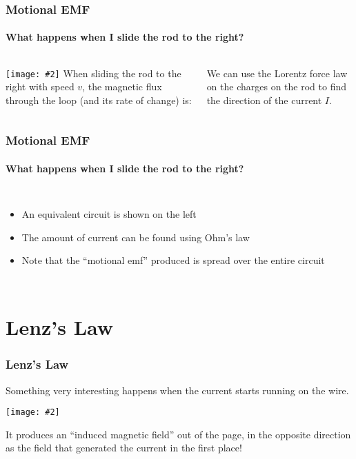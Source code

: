 \documentclass[12pt,aspectratio=169]{beamer}
\newcommand{\pic}[2]{\texttt{[image: \#2]}}
\begin{document}
\begin{frame}
  \frametitle{Motional EMF}
  \framesubtitle{What happens when I slide the rod to the right?}
  \begin{columns}
    \pic{1}{motional-emf-1.jpg}
    When sliding the rod to the right with speed $v$, the magnetic flux through
    the loop (and its rate of change) is:

    
    We can use the Lorentz force law on the charges on the rod to find the
    direction of the current $I$.
  \end{columns}
\end{frame}

\begin{frame}
  \frametitle{Motional EMF}
  \framesubtitle{What happens when I slide the rod to the right?}
  \begin{columns}
    \begin{itemize}
    \item An equivalent circuit is shown on the left
    \item The amount of current can be found using Ohm's law
    \item Note that the ``motional emf'' produced is spread over the entire
      circuit
    \end{itemize}
  \end{columns}
\end{frame}

\section{Lenz's Law}

\begin{frame}
  \frametitle{Lenz's Law}
  Something very interesting happens when the current starts running on the
  wire.

  \vspace{-.2in}
  \begin{center}
    \pic{.35}{motional-emf-2.jpg}
  \end{center}
  
  \vspace{-.1in}It produces an ``induced magnetic field'' out of the page, in
  the opposite direction as the field that generated the current in the first
  place!
\end{frame}
\end{document}
